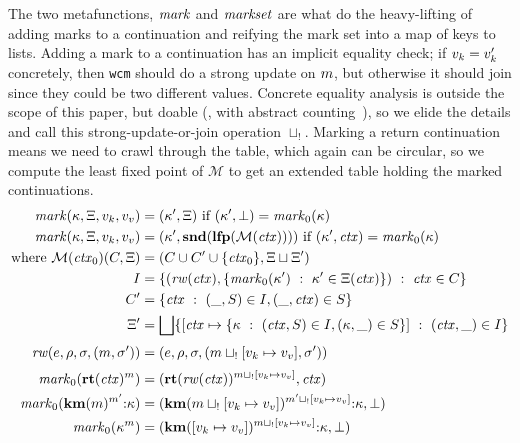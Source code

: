 {The two metafunctions, $\mathit{mark}$ and $\mathit{markset}$ are what do the heavy-lifting of adding marks to a continuation and reifying the mark set into a map of keys to lists.
%
Adding a mark to a continuation has an implicit equality check; if $v_k = v_k'$ concretely, then {\tt wcm} should do a strong update on $m$, but otherwise it should join since they could be two different values.
%
Concrete equality analysis is outside the scope of this paper, but doable (\eg, with abstract counting~\citep{dvanhorn:Might:2006:GammaCFA}), so we elide the details and call this strong-update-or-join operation $\sqcup_{!{}}$.
%
Marking a return continuation means we need to crawl through the table, which again can be circular, so we compute the least fixed point of ${\mathcal M}$ to get an extended table holding the marked continuations.
%
\newcommand{\rewritectx}{\mathit{rw}}
\newcommand{\domarkstep}{\mathit{mark}_0}
\begin{align*}
  \domark(\mkont, \mktab, \mval_k, \mval_v) &= (\mkont', \mktab) \text{ if } (\mkont',\bot) = \domarkstep(\mkont) \\
  \domark(\mkont, \mktab, \mval_k, \mval_v) &= (\mkont', \mathbf{snd}(\lfp({\mathcal M}(\mctx)))) \text{ if } (\mkont',\mctx) = \domarkstep(\mkont) \\
  \text{where } {\mathcal M}(\mctx_0)(C, \mktab) &= (C \cup C' \cup \set{\mctx_0}, \mktab \sqcup \mktab') \\
    I &= \setbuild{(\rewritectx(\mctx), \setbuild{\domarkstep(\mkont')}{\mkont' \in \mktab(\mctx)})}{\mctx \in C} \\
    C' &= \setbuild{\mctx}{(\_, S) \in I, (\_, \mctx) \in S} \\
    \mktab' &= \bigsqcup\setbuild{[\mctx \mapsto \setbuild{\mkont}{(\mctx, S) \in I, (\mkont, \_) \in S}]}{(\mctx,\_) \in I}
\\[2pt]
  \rewritectx(\mexpr,\menv,\mstore,(\mmarks, \mstore')) &= (\mexpr,\menv,\mstore,(\mmarks\sqcup_{!{}}[\mval_k \mapsto \mval_v], \mstore'))
\\[2pt]
  \domarkstep(\krt{\mctx}^\mmarks) &= (\krt{\rewritectx(\mctx)}^{\mmarks \sqcup_{!{}} [\mval_k \mapsto \mval_v]}, \mctx) \\
  \domarkstep(\kcons{\kwcm{\mmarks}^{\mmarks'}}{\mkont}) &= (\kcons{\kwcm{\mmarks \sqcup_{!{}} [\mval_k \mapsto \mval_v]}^{\mmarks' \sqcup_{!{}} [\mval_k \mapsto \mval_v]}}{\mkont}, \bot) \\
  \domarkstep(\mkont^\mmarks) &= (\kcons{\kwcm{[\mval_k \mapsto \mval_v]}^{\mmarks \sqcup_{!{}} [\mval_k \mapsto \mval_v]}}{\mkont}, \bot)
\end{align*}

}
